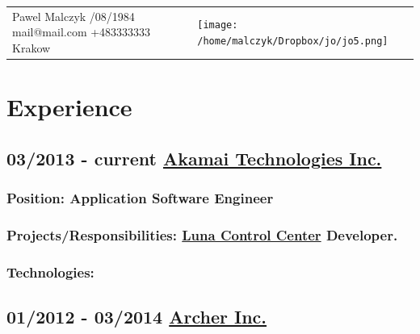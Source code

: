 \documentclass[a4paper]{article}
\begin{document}
\begin{tabular}{  >{\raggedright\arraybackslash}m{10cm}    >{\centering\arraybackslash}m{4cm}  } 
	Pawel Malczyk \newline 21/08/1984 \newline mail@mail.com \newline +483333333 \newline Krakow \newline & \texttt{[image: /home/malczyk/Dropbox/jo/jo5.png]} 
\end{tabular}

\section*{\LARGE{Experience}\newline} 

\subsection*{03/2013 - current \href{http://akamai.com}{Akamai Technologies Inc.}}
\subsubsection*{Position:  \textcolor[RGB]{140,140,140}{Application Software Engineer}}
\subsubsection*{Projects/Responsibilities: \href{http://www.akamai.com/html/technology/luna-control-center.html}{Luna Control Center} Developer.}



\subsubsection*{Technologies:}


\subsection*{01/2012 - 03/2014 \href{http://archermobile.com}{Archer Inc.}}
\end{document}

